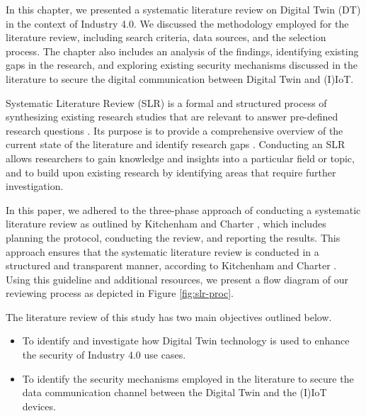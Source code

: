 
In this chapter, we presented a systematic literature review on Digital Twin (DT) in the context of Industry 4.0. We discussed the methodology employed for the literature review, including search criteria, data sources, and the selection process. The chapter also includes an analysis of the findings, identifying existing gaps in the research, and exploring existing security mechanisms discussed in the literature to secure the digital communication between Digital Twin and (I)IoT.


Systematic Literature Review (SLR) is a formal and structured process of synthesizing existing research studies that are relevant to answer pre-defined research questions \cite{kitchenham_guidelines_2007}. Its purpose is to provide a comprehensive overview of the current state of the literature and identify research gaps \cite{carrera-rivera_how-conduct_2022}. Conducting an SLR allows researchers to gain knowledge and insights into a particular field or topic, and to build upon existing research by identifying areas that require further investigation.

In this paper, we adhered to the three-phase approach of conducting a systematic literature review as outlined by Kitchenham and Charter \cite{kitchenham_guidelines_2007}, which includes planning the protocol, conducting the review, and reporting the results. This approach ensures that the systematic literature review is conducted in a structured and transparent manner, according to Kitchenham and Charter \cite{kitchenham_guidelines_2007}. Using this guideline and additional resources, we present a flow diagram of our reviewing process as depicted in Figure \ref{fig:slr-proc}. 

The literature review of this study has two main objectives outlined below.
\begin{itemize}
    \item To identify and investigate how Digital Twin technology is used to enhance the security of Industry 4.0 use cases.

    \item To identify the security mechanisms employed in the literature to secure the data communication channel between the Digital Twin and the (I)IoT devices.
\end{itemize}


